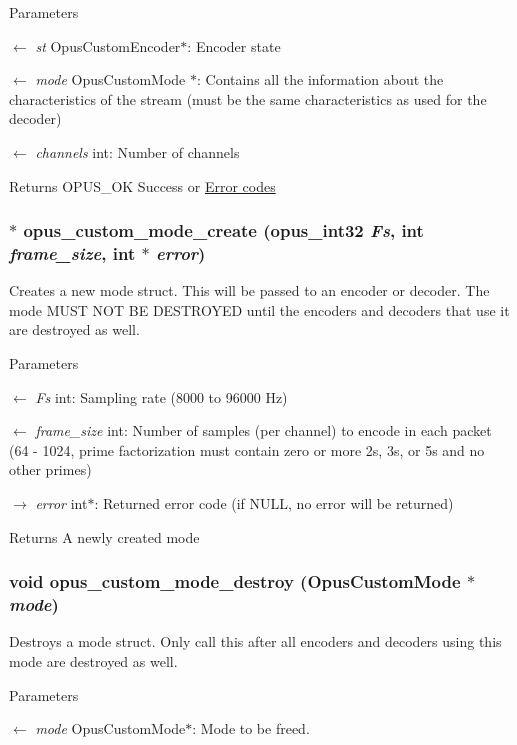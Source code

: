\begin{DoxyParams}{Parameters}
\item[\mbox{$\leftarrow$} {\em st}]{\ttfamily OpusCustomEncoder$\ast$}: Encoder state \item[\mbox{$\leftarrow$} {\em mode}]{\ttfamily OpusCustomMode $\ast$}: Contains all the information about the characteristics of the stream (must be the same characteristics as used for the decoder) \item[\mbox{$\leftarrow$} {\em channels}]{\ttfamily int}: Number of channels \end{DoxyParams}
\begin{DoxyReturn}{Returns}
OPUS\_\-OK Success or \hyperlink{group__opus__errorcodes}{Error codes} 
\end{DoxyReturn}
\hypertarget{group__opus__custom_ga8d6683d0b9f2990a8f54d8bafe4f4027}{
\subsubsection[{opus\_\-custom\_\-mode\_\-create}]{$\ast$ opus\_\-custom\_\-mode\_\-create ({\bf opus\_\-int32} {\em Fs}, \/  int {\em frame\_\-size}, \/  int $\ast$ {\em error})}}
\label{group__opus__custom_ga8d6683d0b9f2990a8f54d8bafe4f4027}


Creates a new mode struct. This will be passed to an encoder or decoder. The mode MUST NOT BE DESTROYED until the encoders and decoders that use it are destroyed as well. 
\begin{DoxyParams}{Parameters}
\item[\mbox{$\leftarrow$} {\em Fs}]{\ttfamily int}: Sampling rate (8000 to 96000 Hz) \item[\mbox{$\leftarrow$} {\em frame\_\-size}]{\ttfamily int}: Number of samples (per channel) to encode in each packet (64 -\/ 1024, prime factorization must contain zero or more 2s, 3s, or 5s and no other primes) \item[\mbox{$\rightarrow$} {\em error}]{\ttfamily int$\ast$}: Returned error code (if NULL, no error will be returned) \end{DoxyParams}
\begin{DoxyReturn}{Returns}
A newly created mode 
\end{DoxyReturn}
\hypertarget{group__opus__custom_ga1333ad19db2acd8edf558ac6365741de}{
\subsubsection[{opus\_\-custom\_\-mode\_\-destroy}]{\setlength{\rightskip}{0pt plus 5cm}void opus\_\-custom\_\-mode\_\-destroy ({\bf OpusCustomMode} $\ast$ {\em mode})}}
\label{group__opus__custom_ga1333ad19db2acd8edf558ac6365741de}


Destroys a mode struct. Only call this after all encoders and decoders using this mode are destroyed as well. 
\begin{DoxyParams}{Parameters}
\item[\mbox{$\leftarrow$} {\em mode}]{\ttfamily OpusCustomMode$\ast$}: Mode to be freed. \end{DoxyParams}
